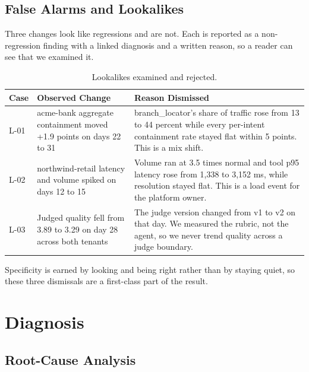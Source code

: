 \documentclass[8pt,twocolumn,a4paper]{extarticle}
\begin{document}
\subsection{False Alarms and Lookalikes}

Three changes look like regressions and are not. Each is reported as a
non-regression finding with a linked diagnosis and a written reason, so
a reader can see that we examined it.

\begin{table}[t]
\centering
\caption{Lookalikes examined and rejected.}
\label{tab:lookalikes}
\small
\begin{tabular}{p{}p{}p{}}
\toprule
\textbf{Case} & \textbf{Observed Change} & \textbf{Reason Dismissed} \\
\midrule
L-01 & acme-bank aggregate containment moved +1.9 points on days 22 to 31 & branch\_locator's share of traffic rose from 13 to 44 percent while every per-intent containment rate stayed flat within 5 points. This is a mix shift. \\
L-02 & northwind-retail latency and volume spiked on days 12 to 15 & Volume ran at 3.5 times normal and tool p95 latency rose from 1,338 to 3,152 ms, while resolution stayed flat. This is a load event for the platform owner. \\
L-03 & Judged quality fell from 3.89 to 3.29 on day 28 across both tenants & The judge version changed from v1 to v2 on that day. We measured the rubric, not the agent, so we never trend quality across a judge boundary. \\
\bottomrule
\end{tabular}
\end{table}

Specificity is earned by looking and being right rather than by staying
quiet, so these three dismissals are a first-class part of the result.


\section{Diagnosis}

\subsection{Root-Cause Analysis}
\end{document}
